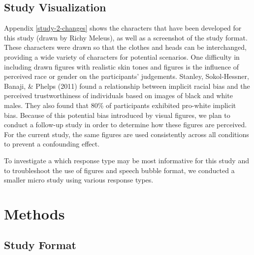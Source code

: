 \documentclass[print]{nuthesis}
\begin{document}
\hypertarget{study-visualization}{%
\subsection{Study Visualization}\label{study-visualization}}

Appendix \ref{study-2-changes} shows the characters that have been developed for this study (drawn by Richy Meleus), as well as a screenshot of the study format.
These characters were drawn so that the clothes and heads can be interchanged, providing a wide variety of characters for potential scenarios.
One difficulty in including drawn figures with realistic skin tones and figures is the influence of perceived race or gender on the participants' judgements.
Stanley, Sokol-Hessner, Banaji, \& Phelps (2011) found a relationship between implicit racial bias and the perceived trustworthiness of individuals based on images of black and white males.
They also found that 80\% of participants exhibited pro-white implicit bias.
Because of this potential bias introduced by visual figures, we plan to conduct a follow-up study in order to determine how these figures are perceived.
For the current study, the same figures are used consistently across all conditions to prevent a confounding effect.

To investigate a which response type may be most informative for this study and to troubleshoot the use of figures and speech bubble format, we conducted a smaller micro study using various response types.

\hypertarget{methods-1}{%
\section{Methods}\label{methods-1}}

\hypertarget{study-format-1}{%
\subsection{Study Format}\label{study-format-1}}
\end{document}
